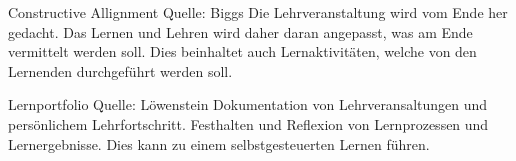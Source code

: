 Constructive Allignment 
Quelle: Biggs 
Die Lehrveranstaltung wird vom Ende her gedacht. Das Lernen und Lehren wird daher daran angepasst, was am Ende vermittelt werden soll. Dies beinhaltet auch Lernaktivitäten, welche von den Lernenden durchgeführt werden soll.

Lernportfolio 
Quelle: Löwenstein
Dokumentation von Lehrveransaltungen und persönlichem Lehrfortschritt. Festhalten und Reflexion von Lernprozessen und Lernergebnisse. Dies kann zu einem selbstgesteuerten Lernen führen.

